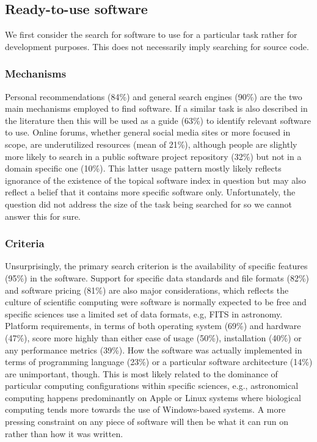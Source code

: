 \documentclass{casicswhitepaper}
\begin{document}
\subsection{Ready-to-use software}
 
We first consider the search for software to use for a particular task rather for development purposes. This does not necessarily imply searching for source code.  
 
\subsubsection{Mechanisms}

Personal recommendations (84\%) and general search engines (90\%) are the two main mechanisms employed to find software. If a similar task is also described in the literature then this will be used as a guide (63\%) to identify relevant software to use. Online forums, whether general social media sites or more focused in scope, are underutilized resources (mean of 21\%), although people are slightly more likely to search in a public software project repository (32\%) but not in a domain specific one (10\%). This latter usage pattern mostly likely reflects ignorance of the existence of the topical software index in question but may also reflect a belief that it contains more specific software only. Unfortunately, the question did not address the size of the task being searched for so we cannot answer this for sure.

\subsubsection{Criteria}

Unsurprisingly, the primary search criterion is the availability of specific features (95\%) in the software. Support for specific data standards and file formats (82\%) and software pricing (81\%) are also major considerations, which reflects the culture of scientific computing were software is normally expected to be free and specific sciences use a limited set of data formats, e.g, FITS in astronomy. Platform requirements, in terms of both operating system (69\%) and hardware (47\%), score more highly than either ease of usage (50\%), installation (40\%) or any performance metrics (39\%). How the software was actually implemented in terms of programming language (23\%) or a particular software architecture (14\%) are unimportant, though. This is most likely related to the dominance of particular computing configurations within specific sciences, e.g., astronomical computing happens predominantly on Apple or Linux systems where biological computing tends more towards the use of Windows-based systems. A more pressing constraint on any piece of software will then be what it can run on rather than how it was written.
\end{document}
